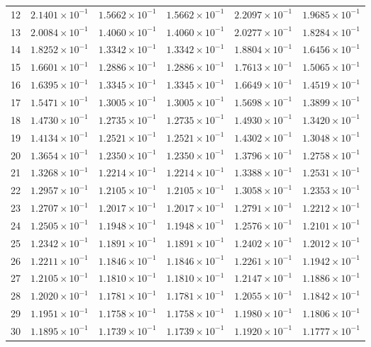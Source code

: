 \begin{table}[H]
\begin{tabular}{@{}rrrrrr@{}}
12 & $2.1401\times10^{-1}$ & $1.5662\times10^{-1}$ & $1.5662\times10^{-1}$ & $2.2097\times10^{-1}$ & $1.9685\times10^{-1}$\\
13 & $2.0084\times10^{-1}$ & $1.4060\times10^{-1}$ & $1.4060\times10^{-1}$ & $2.0277\times10^{-1}$ & $1.8284\times10^{-1}$\\
14 & $1.8252\times10^{-1}$ & $1.3342\times10^{-1}$ & $1.3342\times10^{-1}$ & $1.8804\times10^{-1}$ & $1.6456\times10^{-1}$\\
15 & $1.6601\times10^{-1}$ & $1.2886\times10^{-1}$ & $1.2886\times10^{-1}$ & $1.7613\times10^{-1}$ & $1.5065\times10^{-1}$\\
16 & $1.6395\times10^{-1}$ & $1.3345\times10^{-1}$ & $1.3345\times10^{-1}$ & $1.6649\times10^{-1}$ & $1.4519\times10^{-1}$\\
17 & $1.5471\times10^{-1}$ & $1.3005\times10^{-1}$ & $1.3005\times10^{-1}$ & $1.5698\times10^{-1}$ & $1.3899\times10^{-1}$\\
18 & $1.4730\times10^{-1}$ & $1.2735\times10^{-1}$ & $1.2735\times10^{-1}$ & $1.4930\times10^{-1}$ & $1.3420\times10^{-1}$\\
19 & $1.4134\times10^{-1}$ & $1.2521\times10^{-1}$ & $1.2521\times10^{-1}$ & $1.4302\times10^{-1}$ & $1.3048\times10^{-1}$\\
20 & $1.3654\times10^{-1}$ & $1.2350\times10^{-1}$ & $1.2350\times10^{-1}$ & $1.3796\times10^{-1}$ & $1.2758\times10^{-1}$\\
21 & $1.3268\times10^{-1}$ & $1.2214\times10^{-1}$ & $1.2214\times10^{-1}$ & $1.3388\times10^{-1}$ & $1.2531\times10^{-1}$\\
22 & $1.2957\times10^{-1}$ & $1.2105\times10^{-1}$ & $1.2105\times10^{-1}$ & $1.3058\times10^{-1}$ & $1.2353\times10^{-1}$\\
23 & $1.2707\times10^{-1}$ & $1.2017\times10^{-1}$ & $1.2017\times10^{-1}$ & $1.2791\times10^{-1}$ & $1.2212\times10^{-1}$\\
24 & $1.2505\times10^{-1}$ & $1.1948\times10^{-1}$ & $1.1948\times10^{-1}$ & $1.2576\times10^{-1}$ & $1.2101\times10^{-1}$\\
25 & $1.2342\times10^{-1}$ & $1.1891\times10^{-1}$ & $1.1891\times10^{-1}$ & $1.2402\times10^{-1}$ & $1.2012\times10^{-1}$\\
26 & $1.2211\times10^{-1}$ & $1.1846\times10^{-1}$ & $1.1846\times10^{-1}$ & $1.2261\times10^{-1}$ & $1.1942\times10^{-1}$\\
27 & $1.2105\times10^{-1}$ & $1.1810\times10^{-1}$ & $1.1810\times10^{-1}$ & $1.2147\times10^{-1}$ & $1.1886\times10^{-1}$\\
28 & $1.2020\times10^{-1}$ & $1.1781\times10^{-1}$ & $1.1781\times10^{-1}$ & $1.2055\times10^{-1}$ & $1.1842\times10^{-1}$\\
29 & $1.1951\times10^{-1}$ & $1.1758\times10^{-1}$ & $1.1758\times10^{-1}$ & $1.1980\times10^{-1}$ & $1.1806\times10^{-1}$\\
30 & $1.1895\times10^{-1}$ & $1.1739\times10^{-1}$ & $1.1739\times10^{-1}$ & $1.1920\times10^{-1}$ & $1.1777\times10^{-1}$\\
\bottomrule
\end{tabular}
\end{table}


